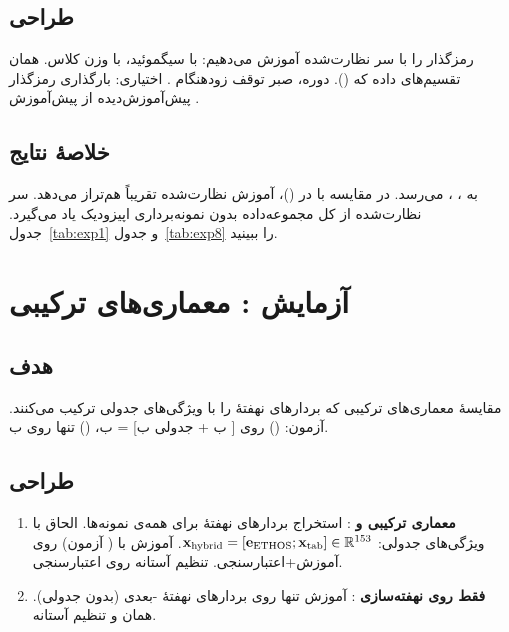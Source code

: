 \subsection{طراحی}

رمزگذار  را با سر نظارت‌شده آموزش می‌دهیم:  با سیگموئید،  با وزن کلاس. همان تقسیم‌های داده که  ().  دوره، صبر توقف زودهنگام . اختیاری: بارگذاری رمزگذار  پیش‌آموزش‌دیده از پیش‌آموزش .

\subsection{خلاصۀ نتایج}

\texttt{} به  ،  ،   می‌رسد. در مقایسه با  در  ()، آموزش نظارت‌شده  تقریباً هم‌تراز می‌دهد. سر نظارت‌شده از کل مجموعه‌داده بدون نمونه‌برداری اپیزودیک یاد می‌گیرد. جدول~\ref{tab:exp1} و جدول~\ref{tab:exp8} را ببینید.

\section{آزمایش : معماری‌های ترکیبی}
\label{sec:exp-hybrid}

\subsection{هدف}

مقایسۀ معماری‌های ترکیبی که بردارهای نهفتۀ  را با ویژگی‌های جدولی ترکیب می‌کنند. آزمون: ()  روی [ ب + جدولی ب] = ب، ()  تنها روی  ب.

\subsection{طراحی}

\begin{enumerate}
\item \textbf{معماری ترکیبی  و }: استخراج بردارهای نهفتۀ  برای همه‌ی نمونه‌ها. الحاق با ویژگی‌های جدولی: $\mathbf{x}_{\text{hybrid}} = [\mathbf{e}_{\text{ETHOS}}; \mathbf{x}_{\text{tab}}] \in \mathbb{R}^{153}$. آموزش  با  ( آزمون) روی آموزش+اعتبارسنجی. تنظیم آستانه روی اعتبارسنجی.
\item \textbf{ فقط روی نهفته‌سازی }: آموزش  تنها روی بردارهای نهفتۀ -بعدی  (بدون جدولی). همان  و تنظیم آستانه.
\end{enumerate}

